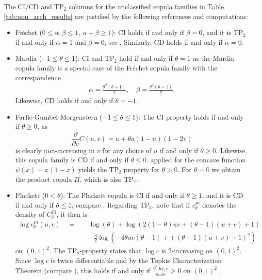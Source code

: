 \documentclass{article}
\newcommand{\TP}{\mathrm{TP_2}}
\begin{document}
The CI/CD and $\TP$ columns for the unclassified copula families in Table \ref{tab:non_arch_results} are justified by the following references and computations:
\begin{itemize}
    \item Fréchet ($0\leq \alpha,\beta\leq 1$, $\alpha+\beta\geq 1$): CI holds if and only if $\beta = 0$, and it is $\TP$ if and only if $\alpha=1$ and $\beta=0$, see \cite[Example 3.5]{fuchs2023total}.
    Similarly, CD holds if and only if $\alpha = 0$.
    \item Mardia ($-1\leq \theta\leq 1$): CI and $\TP$ hold if and only if $\theta =1$ as the Mardia copula family is a special case of the Fréchet copula family with the correspondence
    \begin{align}\label{frm:mardia_frechet_correspondence}
        \alpha = \frac{\theta^2(\theta+1)}{2}, \quad \beta=\frac{\theta^2(\theta-1)}{2}
    .\end{align}
    Likewise, CD holds if and only if $\theta = -1$.
    \item Farlie-Gumbel-Morgenstern ($-1\leq \theta\leq 1$):
    The CI property holds if and only if $\theta\geq 0$, as 
    \[
        \frac{\partial}{\partial v} C(u, v)
        = u + \theta u (1-u)(1-2v)
    \]
    is clearly non-increasing in $v$ for any choice of $u$ if and only if $\theta\geq 0$.
    Likewise, this copula family is CD if and only if $\theta\leq 0$.
    \cite[Theorem 3]{amblard2002symmetry} applied for the concave function $\psi(x) = x(1-x)$ yields the $\TP$ property for $\theta > 0$.
    For $\theta = 0$ we obtain the product copula $\Pi$, which is also $\TP$.
    \item Plackett ($0 < \theta$):
    The Plackett copula is CI if and only if $\theta \geq 1$, and it is CD if and only if $\theta\leq 1$, compare \cite[Example 5.16]{Nelsen-2006}.
    Regarding $\TP$, note that if $c^{\text{Pl}}_\theta$ denotes the density of $C^{\text{Pl}}_\theta$, it then is
    \begin{align*}
        \log c^{\text{Pl}}_\theta(u,v)
        \quad = \quad & \phantom{}\log{\left(\theta \right)} + \log{\left(2 (1-\theta) u v + (\theta-1) (u + v) + 1 \right)} \\
        & - \frac32 \log{\left(- 4 \theta u v \left(\theta - 1\right) + \left(\left(\theta - 1\right) \left(u + v\right) + 1\right)^{2} \right)}
    \end{align*}
    on $(0,1)^2$.
    The $\TP$-property states that $\log c$ is 2-increasing on $(0,1)^2$.
    Since $\log c$ is twice differentiable and by the Topkis Characterization Theorem (compare \cite{milgrom1990rationalizability}), this holds if and only if $\frac{\partial^2\log c}{\partial u \partial v} \geq 0$ on $(0,1)^2$.

\end{itemize}
\end{document}
